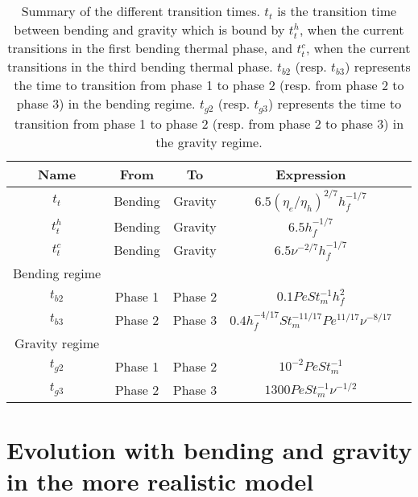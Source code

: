 \begin{table}[h!]
  \begin{center}
    \begin{tabular}{c|cc|cc}
      Name&From&To&Expression\\
      \hline
      $t_t$&Bending&Gravity&$6.5(\eta_e/\eta_h)^{2/7}h_f^{-1/7}$\\
      $t_t^h$&Bending&Gravity&$6.5h_f^{-1/7}$\\
      $t_t^c$&Bending&Gravity&$6.5\nu^{-2/7}h_f^{-1/7}$\\
      Bending regime&\multicolumn{2}{c}{}& \\
      $t_{b2}$&Phase 1& Phase 2&$0.1 Pe St_m^{-1} h_f^2$\\
      $t_{b3}$&Phase 2& Phase 3 &$0.4 h_f^{-4/17} St_m^{-11/17}Pe^{11/17}\nu^{-8/17}$\\
      Gravity regime&\multicolumn{3}{c}{} \\
      $t_{g2}$ &Phase 1& Phase 2 &$10^{-2}PeSt_m^{-1}$\\
      $t_{g3}$ &Phase 2& Phase 3 &$ 1300Pe St_m^{-1}\nu^{-1/2}$\\
    \end{tabular}
    \caption{Summary of the different  transition times.  $t_t$ is the
      transition time  between bending and  gravity which is  bound by
      $t_t^h$,  when  the current  transitions  in  the first  bending
      thermal phase, and $t_t^c$, when  the current transitions in the
      third  bending   thermal  phase.   $t_{b2}$   (resp.   $t_{b3}$)
      represents  the time  to  transition  from phase  1  to phase  2
      (resp. from phase 2 to phase  3) in the bending regime. $t_{g2}$
      (resp. $t_{g3}$) represents the time  to transition from phase 1
      to  phase 2  (resp. from  phase  2 to  phase 3)  in the  gravity
      regime. }
    \label{tab:TimeTransition}
  \end{center}
\end{table}
\section{Evolution  with bending  and  gravity in  the more  realistic
  model}
\label{C4-sec:evol-with-bend}

